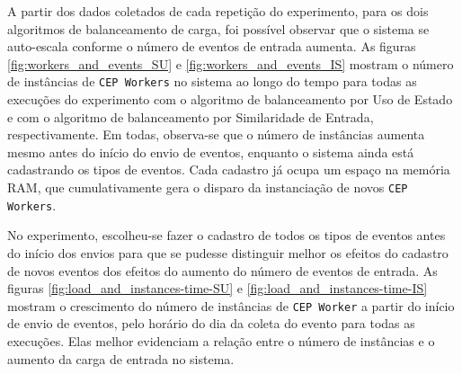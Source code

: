 




A partir dos dados coletados de cada repetição do experimento, para os dois algoritmos de balanceamento de carga, foi possível observar que o sistema se auto-escala conforme o número de eventos de entrada aumenta. As figuras \ref{fig:workers_and_events_SU}  e \ref{fig:workers_and_events_IS} mostram o número de instâncias de \texttt{CEP Workers} no sistema ao longo do tempo para todas as execuções do experimento com o algoritmo de balanceamento por Uso de Estado e com o algoritmo de balanceamento por Similaridade de Entrada, respectivamente. 
Em todas, observa-se que o número de instâncias aumenta mesmo antes do início do envio de eventos, enquanto o sistema ainda está cadastrando os tipos de eventos. Cada cadastro já ocupa um espaço na memória RAM, que cumulativamente gera o disparo da instanciação de novos \texttt{CEP Workers}.


No experimento, escolheu-se fazer o cadastro de todos os tipos de eventos antes do início dos envios para que se pudesse distinguir melhor os efeitos do cadastro de novos eventos dos efeitos do aumento do número de eventos de entrada. As figuras \ref{fig:load_and_instances-time-SU}  e \ref{fig:load_and_instances-time-IS} mostram o crescimento do número de instâncias de \texttt{CEP Worker} a partir do início de envio de eventos, pelo horário do dia da coleta do evento para todas as execuções. Elas melhor evidenciam a relação entre o número de instâncias e o aumento da carga de entrada no sistema.

